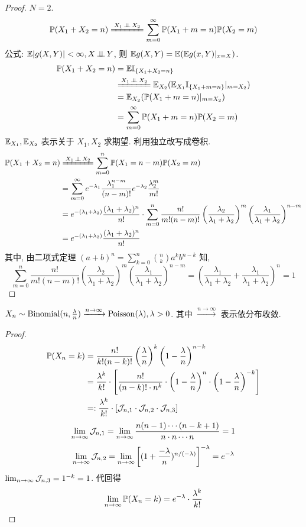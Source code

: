 \begin{proof}
    $N=2$. 
    \[
    \PP(X_1+X_2=n)\xlongequal{X_1\ind X_2}\sum_{m=0}^{\infty}\PP(X_1+m=n)\PP(X_2=m)
    \]
    公式: $\mathbb E |g(X,Y)|<\infty, X\operatorname{\perp\!\!\!\perp} Y$, 则 $\mathbb E g(X,Y)=\mathbb E(\mathbb E g(x,Y)|_{x=X})$.
    \[
    \begin{aligned}
        \PP(X_1+X_2=n) &=\EE \II_{\{X_1+X_2=n\}}\\
        &\xlongequal{X_1\ind X_2}\EE_{X_2}(\EE_{X_1} \II_{\{X_1+m=n\}}|_{m=X_2})\\
        &=\EE_{X_2}(\PP(X_1+m=n)|_{m=X_2})\\
        &=\sum_{m=0}^{\infty}\PP(X_1+m=n)\PP(X_2=m)
    \end{aligned}
    \]
    $\mathbb E_{X_1},\mathbb E_{X_2}$ 表示关于 $X_1,X_2$ 求期望. 利用独立改写成卷积.
    \[
    \begin{aligned}
        \PP(X_1+X_2=n) &\xlongequal{X_1\ind X_2} \sum_{m=0}^n \PP(X_1=n-m)\PP(X_2=m)\\
        &=\sum_{m=0}^{\infty}e^{-\lambda_1}\frac{\lambda_1^{n-m}}{(n-m)!}e^{-\lambda_2}\frac{\lambda_2^m}{m!}\\
        &=e^{-(\lambda_1+\lambda_2)}\frac{(\lambda_1+\lambda_2)^n}{n!}\cdot \sum_{m=0}^n\frac{n!}{m!(n-m)!}\left(\frac{\lambda_2}{\lambda_1+\lambda_2}\right)^m\left(\frac{\lambda_1}{\lambda_1+\lambda_2}\right)^{n-m}\\
        &=e^{-(\lambda_1+\lambda_2)}\frac{(\lambda_1+\lambda_2)^n}{n!}
    \end{aligned}
    \]
其中, 由二项式定理 $(a + b)^n = \sum_{k=0}^{n} \binom{n}{k} a^k b^{n-k}$ 知,
    \[
    \sum_{m=0}^n\frac{n!}{m!(n-m)!}\left(\frac{\lambda_2}{\lambda_1+\lambda_2}\right)^m\left(\frac{\lambda_1}{\lambda_1+\lambda_2}\right)^{n-m}=\left(\frac{\lambda_1}{\lambda_1+\lambda_2}+\frac{\lambda_1}{\lambda_1+\lambda_2}\right)^n=1
    \]
\end{proof}

\begin{theorem}
    $X_n\sim \operatorname{Binomial}(n,\frac{\lambda}{n})\xrightarrow{n\to\infty}\operatorname{Poisson}(\lambda), \lambda>0$. 其中 $\xrightarrow{n\to\infty}$ 表示依分布收敛.
\end{theorem}

\begin{proof}
\[
\begin{aligned}
    \mathbb{P}(X_n=k) &=\frac{n!}{k!(n-k)!}\left(\frac{\lambda}{n}\right)^k \left(1-\frac{\lambda}{n}\right)^{n-k}\\
    &=\frac{\lambda^k}{k!}\cdot \left[\frac{n!}{(n-k)!\cdot n^k}\cdot \left(1-\frac{\lambda}{n}\right)^n\cdot \left(1-\frac{\lambda}{n}\right)^{-k} \right]\\
    &=:\frac{\lambda^k}{k!}\cdot [\mathcal{J}_{n,1}\cdot \mathcal{J}_{n,2}\cdot \mathcal{J}_{n,3}]
\end{aligned}
\]
\[
\lim_{n\to\infty}\mathcal{J}_{n,1}=\lim_{n\to\infty}\frac{n(n-1)\cdots (n-k+1)}{n\cdot n\cdots n}=1
\]
\[
\lim_{n\to\infty}\mathcal{J}_{n,2}=\lim_{n\to\infty}\left[(1+\frac{-\lambda}{n})^{n/(-\lambda)}\right]^{-\lambda}=e^{-\lambda}
\]
$\lim_{n\to\infty}\mathcal{J}_{n,3}=1^{-k}=1$. 代回得
\[
\lim_{n\to\infty}\mathbb{P}(X_n=k)=e^{-\lambda}\cdot \frac{\lambda^k}{k!}
\]
\end{proof}
\newpage